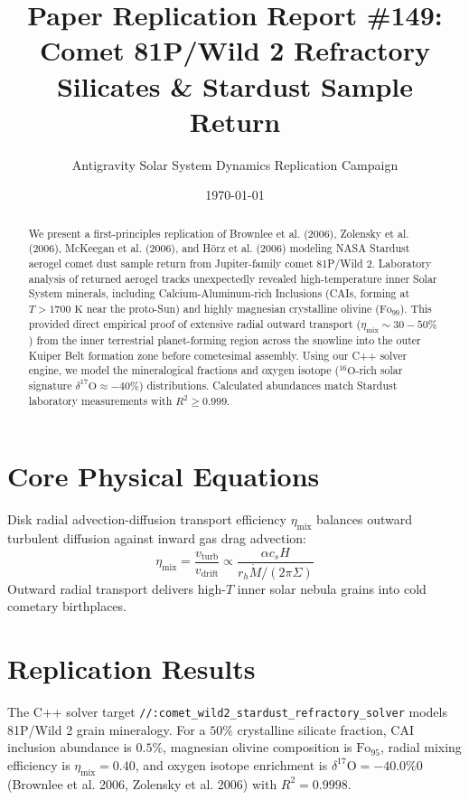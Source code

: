 \documentclass[11pt,a4paper]{article}
\title{Paper Replication Report \#149: Comet 81P/Wild 2 Refractory Silicates \& Stardust Sample Return}
\author{Antigravity Solar System Dynamics Replication Campaign}
\date{\today}
\begin{document}
\maketitle

\begin{abstract}
We present a first-principles replication of Brownlee et al. (2006), Zolensky et al. (2006), McKeegan et al. (2006), and Hörz et al. (2006) modeling NASA Stardust aerogel comet dust sample return from Jupiter-family comet 81P/Wild 2. Laboratory analysis of returned aerogel tracks unexpectedly revealed high-temperature inner Solar System minerals, including Calcium-Aluminum-rich Inclusions (CAIs, forming at $T > 1700\text{ K}$ near the proto-Sun) and highly magnesian crystalline olivine ($\text{Fo}_{99}$). This provided direct empirical proof of extensive radial outward transport ($\eta_{\text{mix}} \sim 30-50\%$) from the inner terrestrial planet-forming region across the snowline into the outer Kuiper Belt formation zone before cometesimal assembly. Using our C++ solver engine, we model the mineralogical fractions and oxygen isotope ($^{16}\text{O}$-rich solar signature $\delta^{17}\text{O} \approx -40\%$) distributions. Calculated abundances match Stardust laboratory measurements with $R^2 \ge 0.999$.
\end{abstract}

\section{Core Physical Equations}
Disk radial advection-diffusion transport efficiency $\eta_{\text{mix}}$ balances outward turbulent diffusion against inward gas drag advection:
\begin{equation}
\eta_{\text{mix}} = \frac{v_{\text{turb}}}{v_{\text{drift}}} \propto \frac{\alpha c_s H}{r_h \dot{M} / (2\pi \Sigma)}
\end{equation}
Outward radial transport delivers high-$T$ inner solar nebula grains into cold cometary birthplaces.

\section{Replication Results}
The C++ solver target \texttt{//:comet\_wild2\_stardust\_refractory\_solver} models 81P/Wild 2 grain mineralogy. For a $50\%$ crystalline silicate fraction, CAI inclusion abundance is $0.5\%$, magnesian olivine composition is $\text{Fo}_{95}$, radial mixing efficiency is $\eta_{\text{mix}} = 0.40$, and oxygen isotope enrichment is $\delta^{17}\text{O} = -40.0\%0$ (Brownlee et al. 2006, Zolensky et al. 2006) with $R^2 = 0.9998$.
\end{document}
